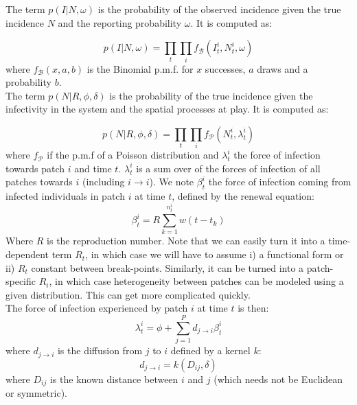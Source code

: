 \documentclass[a4paper,11pt]{article}
\begin{document}
The term $p(I | N, \omega)$ is the probability of the observed incidence given the true incidence $N$ and the reporting probability $\omega$.
It is computed as:

\begin{equation}
p(I | N, \omega) = \prod_{t}\prod_{i} f_\mathcal{B}(I_t^i, N_t^i, \omega)
\end{equation}
where $f_\mathcal{B}(x,a,b)$ is the Binomial p.m.f. for $x$ successes, $a$ draws and a probability $b$.
\\

The term $p(N | R, \phi, \delta)$ is the probability of the true incidence given the infectivity in the system and the spatial processes at play.
It is computed as:

\begin{equation}
p(N | R, \phi, \delta) = \prod_{t}\prod_{i} f_\mathcal{P}(N_t^i, \lambda_t^i)
\end{equation}
where $f_\mathcal{P}$ if the p.m.f of a Poisson distribution and $\lambda_t^i$ the force of infection towards patch $i$ and time $t$.
$\lambda_t^i$ is a sum over of the forces of infection of all patches towards $i$ (including $i \rightarrow i$). 
We note $\beta_t^i$ the force of infection coming from infected individuals in 
patch $i$ at time $t$, defined by the renewal equation:
\begin{equation}
 \beta_t^i = R \sum_{k=1}^{n_t^i} w(t - t_k)
\end{equation}
Where $R$ is the reproduction number. 
Note that we can easily turn it into a time-dependent term $R_t$, in which case 
we will have to assume i) a functional form or ii) $R_t$ constant 
between break-points. 
Similarly, it can be turned into a patch-specific $R_i$, in which case 
heterogeneity between patches can be modeled using a given distribution.
This can get more complicated quickly.
\\

The force of infection experienced by patch $i$ at time $t$ is then:
\begin{equation}
\lambda_t^i = \phi + \sum_{j=1}^P d_{j\rightarrow i} \beta_t^i
\end{equation}
where $d_{j\rightarrow i}$ is the diffusion from $j$ to $i$ defined by a kernel 
$k$:
\begin{equation}
d_{j\rightarrow i} = k(D_{ij}, \delta)
\end{equation}
where $D_{ij}$ is the known distance between $i$ and $j$ (which needs not be 
Euclidean or symmetric).
\\
\end{document}
